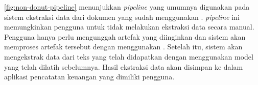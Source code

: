 \autoref{fig:non-donut-pipeline} menunjukkan \emph{pipeline} yang umumnya digunakan pada sistem ekstraksi data dari dokumen yang sudah menggunakan \ocr. \emph{pipeline} ini memungkinkan pengguna untuk tidak melakukan ekstraksi data secara manual. Pengguna hanya perlu mengunggah artefak yang diinginkan dan sistem akan memproses artefak tersebut dengan menggunakan \ocr. Setelah itu, sistem akan mengekstrak data dari teks yang telah didapatkan dengan menggunakan model yang telah dilatih sebelumnya. Hasil ekstraksi data akan disimpan ke dalam aplikasi pencatatan keuangan yang dimiliki pengguna.

